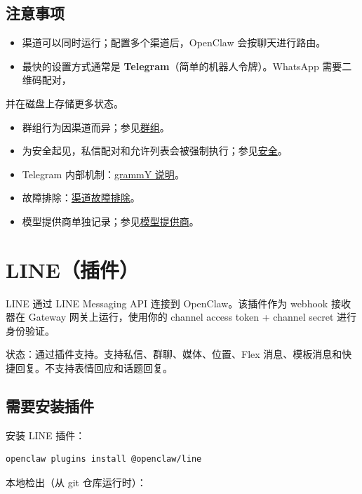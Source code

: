 \subsection{注意事项}


\begin{itemize}
  \item 渠道可以同时运行；配置多个渠道后，OpenClaw 会按聊天进行路由。
  \item 最快的设置方式通常是 \textbf{Telegram}（简单的机器人令牌）。WhatsApp 需要二维码配对，
\end{itemize}

并在磁盘上存储更多状态。
\begin{itemize}
  \item 群组行为因渠道而异；参见\href{/channels/groups}{群组}。
  \item 为安全起见，私信配对和允许列表会被强制执行；参见\href{/gateway/security}{安全}。
  \item Telegram 内部机制：\href{/channels/grammy}{grammY 说明}。
  \item 故障排除：\href{/channels/troubleshooting}{渠道故障排除}。
  \item 模型提供商单独记录；参见\href{/providers/models}{模型提供商}。
\end{itemize}



\clearpage

\section{LINE（插件）}


LINE 通过 LINE Messaging API 连接到 OpenClaw。该插件作为 webhook 接收器在 Gateway 网关上运行，使用你的 channel access token + channel secret 进行身份验证。

状态：通过插件支持。支持私信、群聊、媒体、位置、Flex 消息、模板消息和快捷回复。不支持表情回应和话题回复。

\subsection{需要安装插件}


安装 LINE 插件：

\begin{lstlisting}[language=bash]
openclaw plugins install @openclaw/line
\end{lstlisting}


本地检出（从 git 仓库运行时）：

